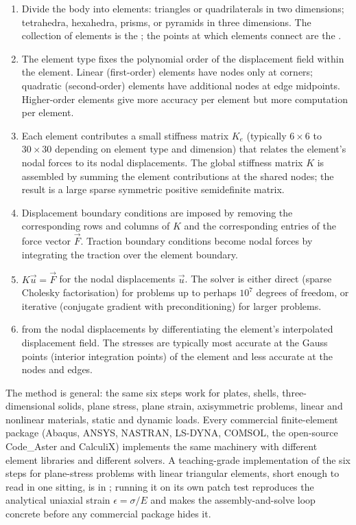 \begin{enumerate}
  \item {} Divide the body into
    elements: triangles or quadrilaterals in two dimensions;
    tetrahedra, hexahedra, prisms, or pyramids in three dimensions.
    The collection of elements is the ; the points at
    which elements connect are the .
  \item {} The element type fixes
    the polynomial order of the displacement field within the
    element. Linear (first-order) elements have nodes only at
    corners; quadratic (second-order) elements have additional
    nodes at edge midpoints. Higher-order elements give more
    accuracy per element but more computation per element.
  \item {} Each
    element contributes a small stiffness matrix $K_e$ (typically
    $6 \times 6$ to $30 \times 30$ depending on element type and
    dimension) that relates the element's nodal forces to its
    nodal displacements. The global stiffness matrix $K$ is
    assembled by summing the element contributions at the shared
    nodes; the result is a large sparse symmetric positive
    semidefinite matrix.
  \item {} Displacement
    boundary conditions are imposed by removing the corresponding
    rows and columns of $K$ and the corresponding entries of the
    force vector $\vec{F}$. Traction boundary conditions become
    nodal forces by integrating the traction over the element
    boundary.
  \item {} $K \vec{u} = \vec{F}$
    for the nodal displacements $\vec{u}$. The solver is either
    direct (sparse Cholesky factorisation) for problems up to
    perhaps $10^7$ degrees of freedom, or iterative (conjugate
    gradient with preconditioning) for larger problems.
  \item {} from the
    nodal displacements by differentiating the element's
    interpolated displacement field. The stresses are typically
    most accurate at the Gauss points (interior integration
    points) of the element and less accurate at the nodes and
    edges.
\end{enumerate}

The method is general: the same six steps work for plates, shells,
three-dimensional solids, plane stress, plane strain, axisymmetric
problems, linear and nonlinear materials, static and dynamic loads.
Every commercial finite-element package (Abaqus, ANSYS, NASTRAN,
LS-DYNA, COMSOL, the open-source Code\_Aster and CalculiX) implements
the same machinery with different element libraries and different
solvers. A teaching-grade implementation of the six steps for
plane-stress problems with linear triangular elements, short enough to
read in one sitting, is in ; running it on
its own patch test reproduces the analytical uniaxial strain
$\epsilon = \sigma/E$ and makes the assembly-and-solve loop concrete
before any commercial package hides it.

